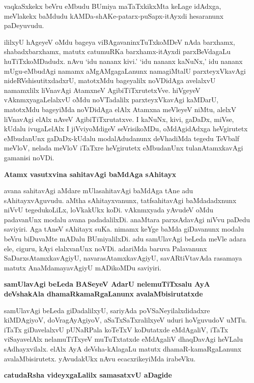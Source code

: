 vaqkaSxkekx beVru eMbudu BUmiya maTaTxkikxMta keLage idAdxga, meVlakekx baMdudu kAMDa-shAKe-patarx-puSapx-itAyxdi hesaranunx paDeyuvudu. 

ililxyU hAgeyeV oMdu bageya viBAgavaninxTuTxkoMDeV nAda barxhamx, shabadxbarxhamx, matutx catumuRKa barxhamx-itAyxdi parxBeVdagaLu huTiTxkoMDadudx. nAvu `idu nananx kivi.' `idu nananx kaNuNx,' idu nananx mUgu-eMbudAgi namamx aMgAMgagaLanunx namagiMtalU parxteyxVkavAgi nideRVshisutitxdadxrU, matotxMdu bageyalilx noVDidAga avelalxvU namamxlilx liVnavAgi AtamxneV AgibiTiTxrutetxVve. hiVgeyeV vAknmxyagaLelalxvU oMdu noVTadalilx parxteyxVkavAgi kaMDarU, matotxMdu bageyiMda noVDidAga elAlx Atamxna meVleyeV niMtu, alelxV liVnavAgi elAlx nAveV AgibiTiTxrutatxve. I kaNuNx, kivi, gaDaDx, miVse, kUdalu ivugaLelAlx I jiVviyoMdigeV seVrisikoMDu, oMdAgidAdxga heVgirutetx eMbudanUnx gaDaDx-kUdalu modalAdudanunx deVhadiMda tegedu TeVbalf meVloV, nelada meVloV iTaTxre heVgirutetx eMbudanUnx tulanAtamxkavAgi gamanisi noVDi.

{\bigskip
\noindent
{\large\bf Atamx vasutxvina sahitavAgi baMdAga sAhitayx}}\label{196}
\medskip

\noindent
avana sahitavAgi aMdare mUlasahitavAgi baMdAga tAne adu sAhitayxvAguvudu. aMtha sAhitayxvanunx, tatfsahitavAgi baMdadadxnunx niVvU tegedukoLiLx, loVkakUkx koDi. vAknmxyada yAvudeV oMdu padavanUnx modalu avana padadalilxDi. \hbox{anaMtara} parxsAdavAgi niVvu paDedu saviyiri. Aga tAneV sAhitayx suKa. nimamx keYge baMda giDavanunx modalu beVru biDuvaMte mADalu BUmiyalilxDi. adu samUlavAgi beLeda meVle adara ele, ciguru, kAyi elalxvanUnx noVDi. adariMda baruva Palavanunx SaDarxsAtamxkavAgiyU, navarasAtamxkavAgiyU, savARtiVtavAda rasamaya matutx AnaMdamayavAgiyU mADikoMDu saviyiri.

{\bigskip
\noindent
{\large\bf samUlavAgi beLeda BASeyeV AdarU nelemuTiTxsalu AyA deVshakAla dhamaRkamaRgaLanunx avalaMbisirutatxde}}\label{page196}
\medskip

\noindent
samUlavAgi beLeda giDadalilxyU, sariyAda poVSaNeyilalxdidadxre kiMDAgiyoV, doVragAyAgiyoV, aSaTxSaTxralilxyeV uduri hoVguvudoV uMTu. iTaTx giDavelalxvU pUNaRPala koTeTxV koDutatxde eMdAgaliV, iTaTx viSayavelAlx nelamuTiTxyeV muTuTxtatxde eMdAgaliV dhaqDavAgi heVLalu sAdhayxvilalx. elAlx AyA deVsha-kAlagaLu matutx dhamaR-kamaRgaLanunx avalaMbisirutetx. yAvudakUkx nAvu ecacxrikeyiMda irabeVku.

{\bigskip
\noindent
{\large\bf catudaRsha videyxgaLalilx samasatxvU aDagide}}\label{page197}
\medskip

